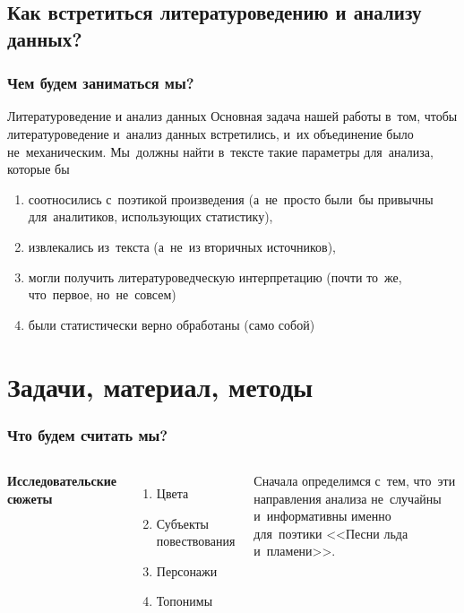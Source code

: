 \documentclass{beamer}
\begin{document}
\subsection{Как встретиться литературоведению и анализу данных?}

\begin{frame}
\frametitle{Чем будем заниматься мы?}

\begin{block}{Литературоведение и анализ данных}
Основная задача нашей работы в~том, чтобы литературоведение и~анализ данных встретились, и~их объединение было \alert{не~механическим}. Мы~должны найти в~тексте такие параметры для~анализа, которые бы
\end{block}
\begin{enumerate}
\item соотносились с~поэтикой произведения (а~не~просто были~бы привычны для~аналитиков, использующих статистику), 
\item извлекались из~текста (а~не~из вторичных источников),
\item могли получить литературоведческую интерпретацию (почти то~же, что~первое, но~не~совсем)
\item были статистически верно обработаны (само собой)
\end{enumerate} 

\end{frame}

\section{Задачи, материал, методы}

\begin{frame}
\frametitle{Что будем считать мы?}
\begin{columns}[c] %

\textbf{Исследовательские сюжеты}
\begin{enumerate}
\item Цвета
\item Субъекты повествования
\item Персонажи
\item Топонимы
\end{enumerate}

Сначала определимся с~тем, что~эти направления анализа не~случайны и~информативны именно для~поэтики <<Песни льда и~пламени>>.

\end{columns}
\end{frame}
\end{document}
